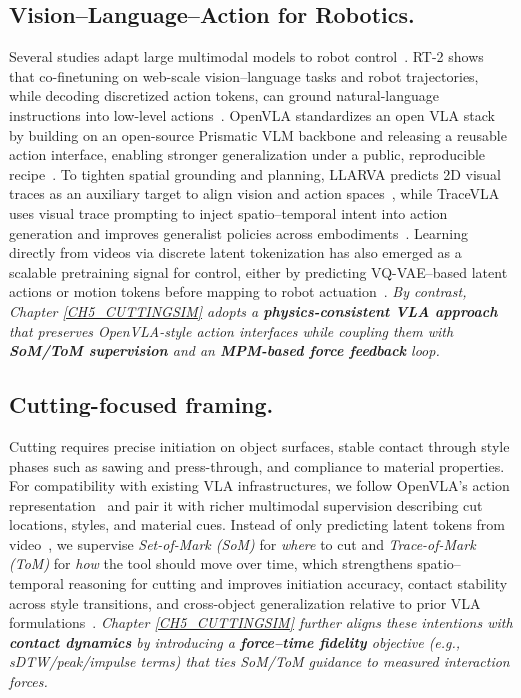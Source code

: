 \subsection{Vision--Language--Action for Robotics.}
    Several studies adapt large multimodal models to robot control~\citep{rt2,openvla,prismaticvlm,llarva,tracevla,lapa,moto}. RT-2 shows that co-finetuning on web-scale vision--language tasks and robot trajectories, while decoding discretized action tokens, can ground natural-language instructions into low-level actions~\citep{rt2}. OpenVLA standardizes an open VLA stack by building on an open-source Prismatic VLM backbone and releasing a reusable action interface, enabling stronger generalization under a public, reproducible recipe~\citep{openvla,prismaticvlm}. To tighten spatial grounding and planning, LLARVA predicts 2D visual traces as an auxiliary target to align vision and action spaces~\citep{llarva}, while TraceVLA uses visual trace prompting to inject spatio--temporal intent into action generation and improves generalist policies across embodiments~\citep{tracevla}. Learning directly from videos via discrete latent tokenization has also emerged as a scalable pretraining signal for control, either by predicting VQ-VAE--based latent actions or motion tokens before mapping to robot actuation~\citep{lapa,moto}. \emph{By contrast, Chapter \ref{CH5_CUTTINGSIM} adopts a \textbf{physics-consistent VLA approach} that preserves OpenVLA-style action interfaces while coupling them with \textbf{SoM/ToM supervision} and an \textbf{MPM-based force feedback} loop.}
    
\subsection{Cutting-focused framing.}
    Cutting requires precise initiation on object surfaces, stable contact through style phases such as sawing and press-through, and compliance to material properties. For compatibility with existing VLA infrastructures, we follow OpenVLA’s action representation~\citep{openvla} and pair it with richer multimodal supervision describing cut locations, styles, and material cues. Instead of only predicting latent tokens from video~\citep{lapa,moto}, we supervise \emph{Set-of-Mark (SoM)} for \emph{where} to cut and \emph{Trace-of-Mark (ToM)} for \emph{how} the tool should move over time, which strengthens spatio--temporal reasoning for cutting and improves initiation accuracy, contact stability across style transitions, and cross-object generalization relative to prior VLA formulations~\citep{rt2,openvla,llarva,tracevla}. \emph{Chapter \ref{CH5_CUTTINGSIM} further aligns these intentions with \textbf{contact dynamics} by introducing a \textbf{force--time fidelity} objective (e.g., sDTW/peak/impulse terms) that ties SoM/ToM guidance to measured interaction forces.}
    
